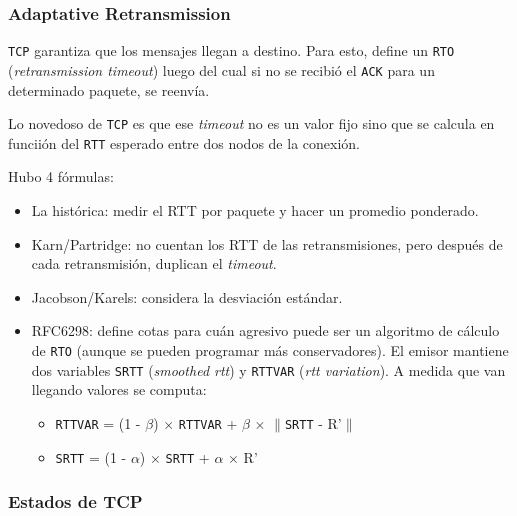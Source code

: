 \documentclass[]{article}
\begin{document}
\subsubsection{Adaptative Retransmission}
\texttt{TCP} garantiza que los mensajes llegan a destino. Para esto, define un \texttt{RTO} (\emph{retransmission timeout}) luego del cual si no se recibió el \texttt{ACK} para un determinado paquete, se reenvía.

Lo novedoso de \texttt{TCP} es que ese \emph{timeout} no es un valor fijo sino que se calcula en funciión del \texttt{RTT} esperado entre dos nodos de la conexión.

Hubo 4 fórmulas:
\begin{itemize}
    \item La histórica: medir el RTT por paquete y hacer un promedio ponderado.
    \item Karn/Partridge: no cuentan los RTT de las retransmisiones, pero después de cada retransmisión, duplican el \emph{timeout}.
    \item Jacobson/Karels: considera la desviación estándar.
    \item RFC6298: define cotas para cuán agresivo puede ser un algoritmo de cálculo de \texttt{RTO} (aunque se pueden programar más conservadores). El emisor mantiene dos variables \texttt{SRTT} (\emph{smoothed rtt}) y \texttt{RTTVAR} (\emph{rtt variation}). A  medida que van llegando valores se computa:
    \begin{itemize}
        \item \texttt{RTTVAR} = (1 - $\beta$) $\times$ \texttt{RTTVAR} + $\beta$ $\times$ $\|$\texttt{SRTT} - R'$\|$
        \item \texttt{SRTT} = (1 - $\alpha$) $\times$ \texttt{SRTT} + $\alpha$ $\times$ R'
    \end{itemize}
\end{itemize}

\subsubsection{Estados de TCP}
\end{document}
